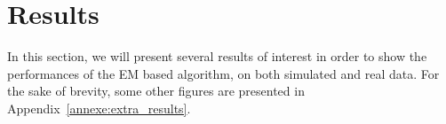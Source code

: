 \section{Results}

In this section, we will present several results of interest in order to show the performances of the EM based algorithm, on both simulated and real data.
For the sake of brevity, some other figures are presented in Appendix~\ref{annexe:extra_results}.



